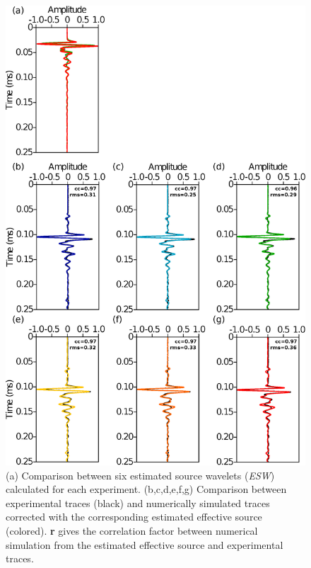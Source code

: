 \documentclass[manuscript,revised]{geophysics}
\begin{document}
\begin{figure}[!h]
	\centering
	\includegraphics[scale=0.4]{fig/panel_lswe_once.eps}
	\caption{(a) Comparison between six estimated source wavelets (\textit{ESW}) calculated for each experiment. (b,c,d,e,f,g) Comparison between experimental traces (black) and numerically simulated traces corrected with the corresponding estimated effective source (colored). \textbf{r} gives the correlation factor between numerical simulation from the estimated effective source and experimental traces.}
	\label{panel_srcest_2d}
\end{figure}
\end{document}

